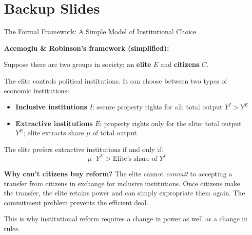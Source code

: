 \documentclass[10pt]{beamer}
\begin{document}
\appendix
\section*{Backup Slides}

\begin{frame}[allowframebreaks]{The Formal Framework: A Simple Model of Institutional Choice}

\textbf{Acemoglu \& Robinson's framework (simplified):}


Suppose there are two groups in society: an \textbf{elite} $E$ and \textbf{citizens} $C$.

The elite controls political institutions. It can choose between two types of economic institutions:
\begin{itemize}
\item \textbf{Inclusive institutions} $I$: secure property rights for all; total output $Y^I > Y^E$
\item \textbf{Extractive institutions} $E$: property rights only for the elite; total output $Y^E$; elite extracts share $\mu$ of total output
\end{itemize}


The elite prefers extractive institutions if and only if:
\[
\mu \cdot Y^E > \text{Elite's share of } Y^I
\]


\textbf{Why can't citizens buy reform?}
The elite cannot \emph{commit} to accepting a transfer from citizens in exchange for inclusive institutions.
Once citizens make the transfer, the elite retains power and can simply expropriate them again.
The commitment problem prevents the efficient deal.


\alert{This is why institutional reform requires a change in power as well as a change in rules.}
\end{frame}
\end{document}

